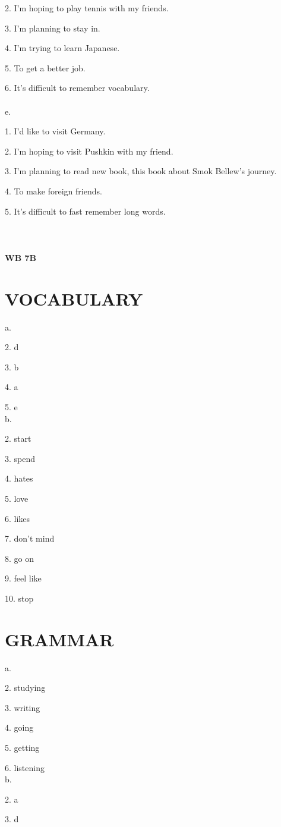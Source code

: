 \documentclass{article}
\begin{document}
2. I'm hoping to play tennis with my friends.

3. I'm planning to stay in.

4. I'm trying to learn Japanese.

5. To get a better job.

6. It's difficult to remember vocabulary.
\\ \\
e.

1. I'd like to visit Germany.

2. I'm hoping to visit Pushkin with my friend.

3. I'm planning to read new book, this book about Smok Bellew's journey.

4. To make foreign friends.

5. It's difficult to fast remember long words.
\\ \\
\\ \\
\textbf{WB 7B}

\section*{VOCABULARY}
a. 

2. d

3. b

4. a 

5. e
\\
b. 

2. start

3. spend

4. hates

5. love

6. likes

7. don't mind

8. go on

9. feel like

10. stop

\section*{GRAMMAR}
a.

2. studying

3. writing 

4. going

5. getting

6. listening 
\\
b. 

2. a

3. d
\end{document}

